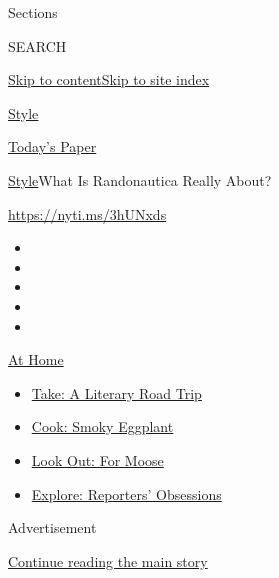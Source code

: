 Sections

SEARCH

\protect\hyperlink{site-content}{Skip to
content}\protect\hyperlink{site-index}{Skip to site index}

\href{https://www.nytimes.com/section/style}{Style}

\href{https://myaccount.nytimes.com/auth/login?response_type=cookie\&client_id=vi}{}

\href{https://www.nytimes.com/section/todayspaper}{Today's Paper}

\href{/section/style}{Style}\textbar{}What Is Randonautica Really About?

\url{https://nyti.ms/3hUNxds}

\begin{itemize}
\item
\item
\item
\item
\item
\end{itemize}

\href{https://www.nytimes.com/spotlight/at-home?action=click\&pgtype=Article\&state=default\&region=TOP_BANNER\&context=at_home_menu}{At
Home}

\begin{itemize}
\tightlist
\item
  \href{https://www.nytimes.com/2020/07/28/books/time-for-a-literary-road-trip.html?action=click\&pgtype=Article\&state=default\&region=TOP_BANNER\&context=at_home_menu}{Take:
  A Literary Road Trip}
\item
  \href{https://www.nytimes.com/2020/07/29/magazine/bored-with-your-home-cooking-some-smoky-eggplant-will-fix-that.html?action=click\&pgtype=Article\&state=default\&region=TOP_BANNER\&context=at_home_menu}{Cook:
  Smoky Eggplant}
\item
  \href{https://www.nytimes.com/2020/07/27/travel/moose-michigan-isle-royale.html?action=click\&pgtype=Article\&state=default\&region=TOP_BANNER\&context=at_home_menu}{Look
  Out: For Moose}
\item
  \href{https://www.nytimes.com/interactive/2020/at-home/even-more-reporters-editors-diaries-lists-recommendations.html?action=click\&pgtype=Article\&state=default\&region=TOP_BANNER\&context=at_home_menu}{Explore:
  Reporters' Obsessions}
\end{itemize}

Advertisement

\protect\hyperlink{after-top}{Continue reading the main story}

